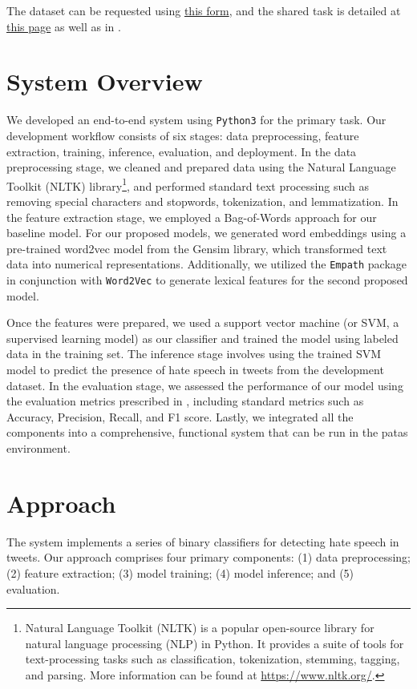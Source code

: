 \documentclass[11pt,a4paper]{article}
\begin{document}
   The dataset can be requested using \href{http://hatespeech.di.unito.it/hateval.html}{this form}, and the shared task is detailed at \href{https://competitions.codalab.org/competitions/19935#learn_the_details-overview}{this page} as well as in \citet{basile-etal-2019-semeval}.


\section{System Overview}
 We developed an end-to-end system using \verb|Python3| for the primary task. Our development workflow consists of six stages: data preprocessing, feature extraction, training, inference, evaluation, and deployment. In the data preprocessing stage, we cleaned and prepared data using the Natural Language Toolkit (NLTK) library\footnote{Natural Language Toolkit (NLTK) is a popular open-source library for natural language processing (NLP) in Python. It provides a suite of tools for text-processing tasks such as classification, tokenization, stemming, tagging, and parsing. More information can be found at \url{https://www.nltk.org/}.}, and performed standard text processing such as removing special characters and stopwords, tokenization, and lemmatization. In the feature extraction stage, we employed a Bag-of-Words approach for our baseline model. For our proposed models, we generated word embeddings using a pre-trained word2vec model from the Gensim library, which transformed text data into numerical representations. Additionally, we utilized the \verb|Empath| package in conjunction with \verb|Word2Vec| to generate lexical features for the second proposed model. 
 
 Once the features were prepared, we used a support vector machine (or SVM, a supervised learning model) as our classifier and trained the model using labeled data in the training set. The inference stage involves using the trained SVM model to predict the presence of hate speech in tweets from the development dataset. In the evaluation stage, we assessed the performance of our model using the evaluation metrics prescribed in \citet{basile-etal-2019-semeval}, including standard metrics such as Accuracy, Precision, Recall, and F1 score. Lastly, we integrated all the components into a comprehensive, functional system that can be run in the patas environment.


\section{Approach}
The system implements a series of binary classifiers for detecting hate speech in tweets. Our approach comprises four primary components: (1) data preprocessing; (2) feature extraction; (3) model training; (4) model inference; and (5) evaluation. 
\end{document}
